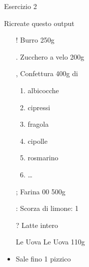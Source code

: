 \begin{frame}{Esercizio 2}

\begin{block}{Ricreate questo output}
 \begin{itemize}
 \item[!] Burro 250g
 \item[.] Zucchero a velo 200g
 \item[,] Confettura 400g di
 \begin{enumerate}
  \item albicocche
  \item cipressi
  \item fragola
  \item cipolle
  \item rosmarino
  \item \dots
 \end{enumerate}

 \item[;] Farina 00 500g
 \item[:] Scorza di limone: 1
 \item[?] Latte intero
 \item[Le Uova] Le Uova 110g
 \item Sale fino 1 pizzico
\end{itemize}
\end{block}

\end{frame}